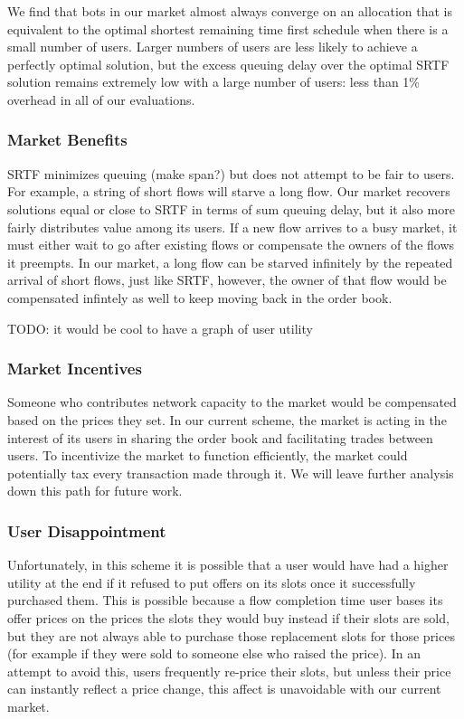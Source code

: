 We find that bots in our market almost always converge on an allocation that is equivalent to the optimal shortest remaining time first schedule when there is a small number of users. Larger numbers of users are less likely to achieve a perfectly optimal solution, but the excess queuing delay over the optimal SRTF solution remains extremely low with a large number of users: less than 1\% overhead in all of our evaluations.

\subsubsection{Market Benefits}
SRTF minimizes queuing (make span?) but does not attempt to be fair to users. For example, a string of short flows will starve a long flow.
Our market recovers solutions equal or close to SRTF in terms of sum queuing delay, but it also more fairly distributes value among its users.
If a new flow arrives to a busy market, it must either wait to go after existing flows or compensate the owners of the flows it preempts. In our market, a long flow can be starved infinitely by the repeated arrival of short flows, just like SRTF, however, the owner of that flow would be compensated infintely as well to keep moving back in the order book.

TODO: it would be cool to have a graph of user utility
\subsubsection{Market Incentives}
Someone who contributes network capacity to the market would be compensated based on the prices they set.
In our current scheme, the market is acting in the interest of its users in sharing the order book and facilitating trades between users.
To incentivize the market to function efficiently, the market could potentially tax every transaction made through it. We will leave further analysis down this path for future work.

\subsubsection{User Disappointment}
Unfortunately, in this scheme it is possible that a user would have had a higher utility at the end if it refused to put offers on its slots once it successfully purchased them.
This is possible because a flow completion time user bases its offer prices on the prices the slots they would buy instead if their slots are sold, but they are not always able to purchase those replacement slots for those prices (for example if they were sold to someone else who raised the price). In an attempt to avoid this, users frequently re-price their slots, but unless their price can instantly reflect a price change, this affect is unavoidable with our current market.

